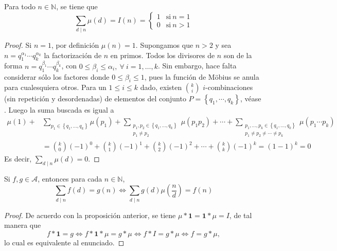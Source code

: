 \begin{proposition}\label{prop:mob2}
Para todo $n\in\mathbb{N}$, se tiene que 
\begin{equation*}
	\sum_{d \mid n} \mu(d) = I(n) =
		\begin{cases}
			1 & \text{si} \: n=1 \\ %
			0 & \text{si} \: n>1
		\end{cases}
\end{equation*}
\end{proposition}
\begin{proof}
Si $n=1$, por definición $\mu(n)=1$. Supongamos que $n>2$ y sea $n=q_1^{\alpha_1}\cdots q_k^{\alpha_k}$ la factorización de $n$ en primos. Todos los divisores de $n$ son de la forma $n=q_1^{\beta_1}\cdots q_k^{\beta_k}$, con $0\leq \beta_i\leq \alpha_i,\:\forall \: i=1,\ldots,k$. Sin embargo, hace falta considerar sólo los factores donde $0\leq \beta_i\leq 1$, pues la función de Möbius se anula para cualesquiera otros. Para un $1\leq i\leq k$ dado, existen $\binom{k}{i}$ $i$-combinaciones (sin repetición y desordenadas) de elementos del conjunto $P=\left\{q_1,\cdots,q_k\right\}$, véase \cite{Br1-1999}. Luego la suma buscada es igual a
\begin{align*}
    \mu(1)+&\sum_{p_1\in\left\{q_1,\ldots,q_k\right\}} \mu(p_1) + \sum_{\substack{p_1,p_2\in \left\{q_1,\ldots,q_k\right\} \\ p_1\neq p_2}} \mu(p_1 p_2)+\cdots+\sum_{\substack{p_1,\ldots,p_k\in \left\{q_1,\ldots,q_k\right\} \\ p_1\neq p_2 \neq \cdots \neq p_k}} \mu(p_1\cdots p_k) \\
						   &= \binom{k}{0}(-1)^0+\binom{k}{1}(-1)^1+\binom{k}{2}(-1)^2+\cdots+\binom{k}{k}(-1)^k =  (1-1)^k=0
\end{align*}
Es decir, $\sum_{d \mid n} \mu(d)=0$.
\end{proof}

\begin{corollary}\label{cor:mob1}
Si $f,g \in \mathcal{A}$, entonces para cada $n \in \mathbb{N}$,
\begin{equation*}
    \sum_{d \mid n} f(d) = g(n) \iff \sum_{d \mid n} g(d)\mu \left( \frac{n}{d} \right) = f(n)
\end{equation*}
\end{corollary}
\begin{proof}
De acuerdo con la proposición anterior, se tiene $\mu*\mathbf{1}=\mathbf{1}*\mu=I$, de tal manera que
\begin{equation*}
    f*\mathbf{1} =  g \iff f*\mathbf{1}*\mu = g * \mu \iff f*I = g * \mu \iff f = g * \mu,
\end{equation*}
lo cual es equivalente al enunciado.
\end{proof}

